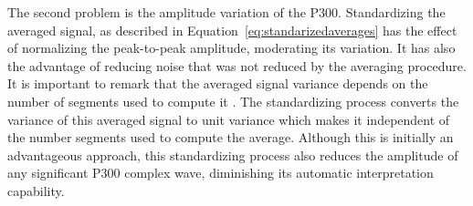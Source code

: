 The second problem is the amplitude variation of the P300.  Standardizing the averaged signal, as described in Equation~\ref{eq:standarizedaverages} has the effect of normalizing the peak-to-peak amplitude, moderating its variation. It has also the advantage of reducing noise that was not reduced by the averaging procedure.   It is important to remark that the averaged signal variance depends on the number of segments used to compute it \cite{van2006signal}.  The standardizing process converts the variance of this averaged signal to unit variance which makes it independent of the number segments used to compute the average.   Although this is initially an advantageous approach, this standardizing process also reduces the amplitude of any significant P300 complex wave, diminishing its automatic interpretation capability.



